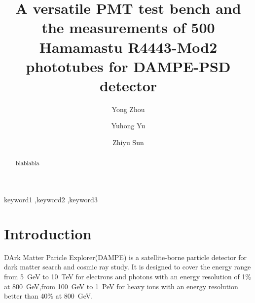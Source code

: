 \documentclass[preprint,3p,times]{elsarticle}
\begin{document}
\begin{frontmatter}

\title{A versatile PMT test bench and the measurements of 500 Hamamastu R4443-Mod2 phototubes for DAMPE-PSD detector}

\author[imp,ucas,lzu]{Yong Zhou}

\author[imp]{Yuhong Yu}

\author[imp]{Zhiyu Sun}


\address[imp]{Institute of Modern Physicas,Chinese Academy of Sciences, 509 Nanchang Road, Lanzhou, 730000, P.R.China}
\address[ucas]{Graduate University of the Chinese Academy of Sciences, 19A Yuquan Road, Beijing, 100049, P.R.China}
\address[lzu]{School of Nuclear Science and Technology, Lanzhou University, 222 South Tianshui Road, Lanzhou, 730000, P.R.China}

\begin{abstract}
blablabla
\end{abstract}

\begin{keyword}
keyword1
\sep keyword2
\sep keyword3



\end{keyword}

\end{frontmatter}

\section{Introduction}
\label{sec:introduction}

DArk Matter Paricle Explorer(DAMPE)\cite{Chang_Jin_dampe} is a satellite-borne particle detector for dark matter search and cosmic ray study.
It is designed to cover the energy range from 5~GeV to 10~TeV for electrons and photons with an energy resolution of 1\% at 800~GeV,from 100~GeV to 1~PeV for heavy ions with an energy resolution better than 40\% at 800~GeV.
\end{document}
